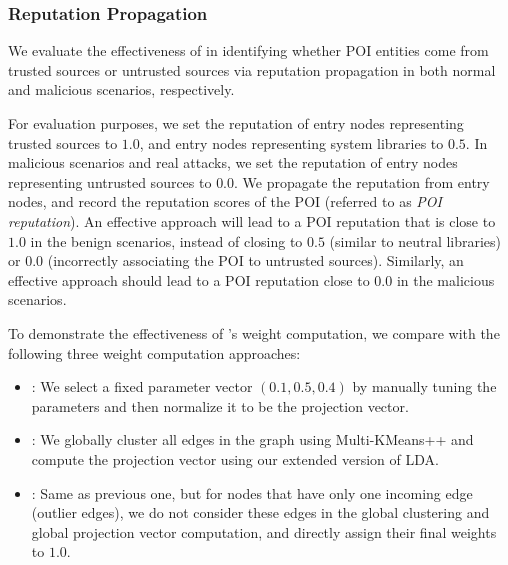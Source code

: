 


\subsubsection{Reputation Propagation}
\label{subsec:reputation-results}
We evaluate the effectiveness of \tool in identifying whether POI entities come from trusted sources or untrusted sources via reputation propagation in both normal and malicious scenarios, respectively.

For evaluation purposes, 
we set the reputation of entry nodes representing trusted sources to $1.0$,
and entry nodes representing system libraries to $0.5$.
In malicious scenarios and real attacks, we set the reputation of entry nodes representing untrusted sources to $0.0$.
We propagate the reputation from entry nodes,
and record the reputation scores of the POI (referred to as \emph{POI reputation}).
An effective approach will lead to a POI reputation that is close to $1.0$ in the benign scenarios, instead of closing to $0.5$ (similar to neutral libraries) or $0.0$ (incorrectly associating the POI to untrusted sources).
Similarly, an effective approach should lead to a POI reputation close to $0.0$ in the malicious scenarios.

To demonstrate the effectiveness of \tool's weight computation, we compare \tool with the following three weight computation approaches:
\begin{itemize}[noitemsep, topsep=1pt, partopsep=1pt, listparindent=\parindent, leftmargin=*]
    
    \item \lpfixed: We select a fixed parameter vector $(0.1, 0.5, 0.4)$ by manually tuning the parameters and then normalize it to be the projection vector.
    
    \item \lpglobal: We globally cluster all edges in the graph using Multi-KMeans++ and compute the projection vector using our extended version of LDA. 
    
    \item \lpglobalplus: Same as previous one, but for nodes that have only one incoming edge (\ie outlier edges), we do not consider these edges in the global clustering and global projection vector computation, and directly assign their final weights to $1.0$.

    
\end{itemize}


